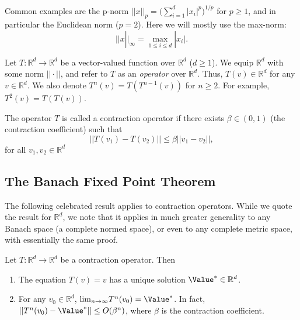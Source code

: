 Common examples are the p-norm $||x|{|_p} = (\sum\nolimits_{i = 1}^d
{{{|{x_i}|}^p}{)^{1/p}}} $ for $p \ge 1$, and in particular the
Euclidean norm ($p = 2$). Here we will mostly use the max-norm:
\[||x|{|_\infty } = {\max _{1 \le i \le d}}|{x_i}|.\]

Let $T:\mathbb R^d \to \mathbb R^d$  be a vector-valued function
over $\mathbb R^d$   ($d \ge 1$).
%
We equip $\mathbb R^d$ with some norm $||
\cdot ||$, and refer to $T$ as an \emph{operator } over $\mathbb
R^d$. Thus, $T(v) \in \mathbb R^d$ for any $v \in \mathbb R^d$. We
also denote ${T^n}(v) = T({T^{n - 1}}(v))$ for  $n \ge 2$. For
example, ${T^2}(v) = T(T(v))$.

\begin{definition} The operator $T$ is called a contraction operator if there exists $\beta  \in (0,1)$ (the contraction coefficient) such that
                            \[||T({v_1}) - T({v_2})|| \le \beta ||{v_1} - {v_2}||,\]
                            for all $v_1,v_2 \in \mathbb R^d$
\end{definition}

\subsection{The Banach Fixed Point Theorem}
The following celebrated result applies to contraction operators. While we quote the result for $\mathbb R^d$, we note that it applies in much greater generality to any Banach space (a complete normed space), or even to any complete metric space, with essentially the same proof.

\begin{theorem}
\label{chapter-discount:thm:Banach}
 Let $T:\mathbb R^d \to \mathbb R^d$  be a
contraction operator. Then
\begin{enumerate}
  \item The equation $T(v) = v$ has a unique solution  $\Value^*\in \mathbb R^d$.
  \item For any $v_0 \in \mathbb R^d$,  ${\lim _{n \to \infty }}{T^n}({v_0}) = {\Value^*}$.
          In fact,  $||{T^n}({v_0}) - {\Value^*}|| \le O({\beta ^n})$, where $\beta $ is the contraction coefficient.
\end{enumerate}
\end{theorem}


